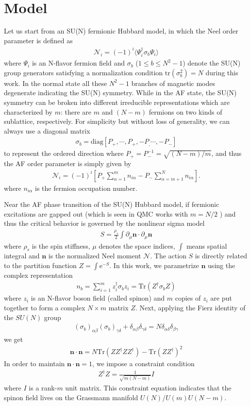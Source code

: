 \documentclass[aps,twocolumn,superscriptaddress]{revtex4-1}
\newcommand{\bea}{\begin{eqnarray}}
\newcommand{\eea}{\end{eqnarray}}
\newcommand{\bn}{\mathbf{n}}
\newcommand{\me}{\mathrm{e}}
\begin{document}
\section{Model}
Let us start from an SU(N) fermionic Hubbard model, in which the Neel order parameter is defined as \bea
\mathcal{N}_i=(-1)^i\langle \Psi_i^\dagger \sigma_b \Psi_i\rangle \eea where $\Psi_i$ is an N-flavor fermion field and
$\sigma_b$ ($1\le b\le N^2-1$) denote the SU(N) group generators satisfying a normalization condition
$\mathrm{tr}(\sigma_b^2)=N$ during this work. In the normal state all these $N^2-1$ branches of magnetic modes
degenerate indicating the SU(N) symmetry. While in the AF state, the SU(N) symmetry can be broken into different
irreducible representations which are characterized by $m$: there are $m$ and $(N-m)$ fermions on two kinds of
sublattice, respectively. For simplicity but without loss of generality, we can always use a diagonal matrix \bea
\sigma_b=\text{diag}\left[P_+,\cdots,P_+,-P_,\cdots,-P_-\right] \eea to represent the ordered direction where
$P_+=P_-^{-1}=\sqrt{(N-m)/m}$, and thus the AF order parameter is simply given by \bea
\mathcal{N}_i=(-1)^i\left[P_+\sum_{\alpha=1}^m n_{i\alpha}-P_-\sum_{\alpha=m+1}^{N}n_{i\alpha} \right]. \eea where
$n_{i\alpha}$ is the fermion occupation number. 

Near the AF phase transition of the SU(N) Hubbard model, if fermionic excitations are gapped out (which is seen in QMC
works with $m=N/2$ \cite{cai2013,wang2014}) and thus the critical behavior is governed by the nonlinear sigma model \bea
\label{eq:NLsM}S=\frac{\rho_s}{2}\int \partial_\mu\bn \cdot \partial_\mu\bn \eea where $\rho_s$ is the spin stiffness,
$\mu$ denotes the space indices, $\int$ means spatial integral and $\bn$ is the normalized Neel moment $\mathcal{N}$.
The action $S$ is directly related to the partition function $Z=\int \me^{-S}$. In this work, we parametrize $\bn$ using
the complex representation \bea \label{eq:cprep}n_b=\sum_{i=1}^m z_i^\dag \sigma_b z_i=\mathrm{Tr}(Z^\dag\sigma_b Z)
\eea where $z_i$ is an N-flavor boson field (called spinon) and $m$ copies of $z_i$ are put together to form a complex
$N\times m$ matrix $Z$. Next, applying the Fierz identity of the $SU(N)$ group \bea \label{eq:Fierz}
(\sigma_b)_{\alpha\beta}
(\sigma_b)_{\gamma\delta}+\delta_{\alpha\beta}\delta_{\gamma\delta}=N\delta_{\alpha\delta}\delta_{\beta\gamma} \eea we
get \bea \bn\cdot\bn = N\mathrm{Tr}(ZZ^\dag Z Z^\dag)-\mathrm{Tr}(ZZ^\dag)^2 \eea In order to maintain $\bn\cdot\bn=1$,
we impose a constraint condition \bea Z^\dag Z=\frac{1}{\sqrt{m(N-m)}}I \label{eq:normalizeZ}\eea where $I$ is a
rank-$m$ unit matrix. This constraint equation indicates that the spinon field lives on the Grassmann manifold
$U(N)/U(m)U(N-m)$. 
\end{document}
